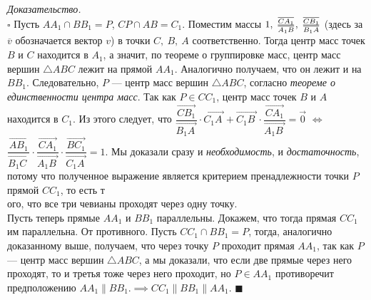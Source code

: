 \documentclass[14pt]{extarticle}
\let\Overrightarrow\overrightarrow
\renewenvironment{proof}
    {\noindent \textit{Доказательство.}\\
	\indent $\square$}
	{ $\blacksquare$\\ }
\begin{document}
\begin{figure}
	\hspace{-0.3cm}
	\vspace{-0.6cm}
	\vspace{-1cm}
\end{figure}

\begin{proof}
    Пусть $AA_1 \cap BB_1 = P$, $CP \cap AB = C_1$. 
	Поместим массы $1, \: \frac{\overline{CA_1}}{\vphantom
	{\overline{AB'}}\overline{A_1B}}, 
	\: \frac{\overline{CB_1}}{\vphantom
	{\overline{AB'}}\overline{B_1A}}$ (здесь за $\overline{v}$
	обозначается вектор $v$)
	в точки $C, \: B, \: A$ соответственно. Тогда центр масс точек
	$B$ и $C$ находится в $A_1$, а значит, по теореме о группировке
	масс, центр масс вершин $\triangle ABC$ лежит на прямой $AA_1$.
	Аналогично получаем, что он лежит и на $BB_1$. Следовательно,
	$P$ --- центр масс вершин $\triangle ABC$, согласно 
	\textit{теореме о единственности центра масс}. 
	Так как $P \in CC_1$, центр масс точек $B$ и $A$ находится в $C_1$.
	Из этого следует, что $\dfrac{\Overrightarrow{CB_1}}
	{\Overrightarrow{B_1A_{\,}}} \cdot \Overrightarrow{C_1A_{\,}} +
	\Overrightarrow{C_1B_{\:}} \cdot
	\dfrac{\Overrightarrow{CA_1}}{\Overrightarrow{A_1B_{\:}}} = \vec{0}$
    $\iff$ 
	$
	\dfrac{\Overrightarrow{AB_1}}{\Overrightarrow{B_1C_{\, \,}}} \cdot 
	\dfrac{\Overrightarrow{CA_1}}
	{\Overrightarrow{A_1B_{\:}}} \cdot \dfrac{\Overrightarrow{BC_1}}
	{\Overrightarrow{C_1A_{\,}}} = 1$.
	Мы доказали сразу и \textit{необходимость}, и \textit{достаточность},
	потому что полученное выражение является критерием пренадлежности точки
	$P$ прямой $CC_1$, то есть
	т\\ого, что все три чевианы проходят через одну точку.\\
    
	Пусть теперь  прямые $AA_1$ и $BB_1$ параллельны. Докажем, что 
	тогда прямая $CC_1$ им параллельна. От противного. Пусть
	$CC_1 \cap BB_1 = P$, тогда, аналогично доказанному выше, получаем, что
	через точку $P$ проходит прямая $AA_1$, так как $P$ --- центр масс
	вершин $\triangle ABC$, а мы доказали, что если две прямые
	через него проходят, то и третья тоже через него проходит,
	но $P \in AA_1$  противоречит предположению
	$AA_1 \parallel BB_1. \implies CC_1 \parallel BB_1 \parallel AA_1$.
\end{proof}
\end{document}
